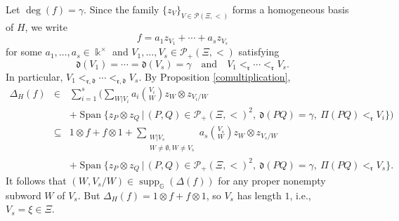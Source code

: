 \documentclass{article}
\makeatletter
\renewenvironment{proof}[1][\proofname]{\par
	\pushQED{\qed}%
	\normalfont \topsep6\p@\@plus6\p@\relax
	\trivlist
	\item[\hskip\labelsep
	\bfseries
	#1\@addpunct{.}]\ignorespaces
}{%
	\popQED\endtrivlist\@endpefalse
}
\theoremstyle{plain}
\theoremstyle{definition}
\numberwithin{equation}{section}
\DeclareMathOperator{\Span}{Span}
\DeclareMathOperator{\supp}{supp}
\newcommand{\GG}{\mathbb{G}}
\newcommand{\dd}{\mathfrak{d}}
\newcommand{\rr}{\mathfrak{r}}
\makeatother
\begin{document}
	\begin{proof}
		Let $\deg(f)=\gamma$. Since the family $\{z_{V}\}_{V\in \mathcal{P}(\Xi, <)}$ forms a homogeneous basis of $H$, we write
		\[
		f = a_{1}z_{V_{1}} + \cdots + a_{s}z_{V_{s}}
		\]
		for some $a_{1},\ldots, a_{s}\in \Bbbk^{\times}$ and $V_{1},\ldots, V_{s}\in \mathcal{P}_{+}(\Xi,<)$ satisfying
		\[
		\dd(V_{1})=\cdots = \dd(V_{s}) =\gamma \quad \text{and} \quad V_{1} <_{\rr} \cdots <_{\rr} V_{s}.
		\]
		In particular, $V_{1} <_{\rr,\dd} \cdots <_{\rr,\dd} V_{s}$. By Proposition \ref{comultiplication},
		\begin{eqnarray*}
			\Delta_{H}(f) & \in & \sum_{i=1}^{s} \Big ( \sum_{W|V_{i}} a_{i} \binom{V_{i}}{W} z_{W}\otimes z_{V_{i}/W} \\
			&& + \Span\bigl\{z_{P}\otimes z_{Q}\,\big|\, (P,Q) \in \mathcal{P}_{+}(\Xi,<)^{2}, ~ \dd(PQ)= \gamma, ~ \Pi(PQ) <_{\rr} V_{i} \bigr\} \Big) \\
			& \subseteq & 1\otimes f+ f\otimes 1 +   \sum_{ \substack{W|V_{s} \\ W\neq \emptyset, W\neq V_{s}}} a_{s} \binom{V_{s}}{W} z_{W}\otimes z_{V_{s}/W} \\
			&& + \Span\bigl\{z_{P}\otimes z_{Q}\,\big|\, (P,Q) \in \mathcal{P}_{+}(\Xi,<)^{2}, ~ \dd(PQ)= \gamma, ~ \Pi(PQ) <_{\rr} V_{s} \bigr\}.
		\end{eqnarray*}
		It follows that $(W,V_{s}/W) \in \supp_{\GG}(\Delta(f))$ for any proper nonempty subword $W$ of $V_{s}$. But $\Delta_{H}(f) =1\otimes f+f\otimes 1$, so $V_{s}$ has length $1$, i.e., $V_{s} =\xi\in \Xi$.
	\end{proof}
	
\end{document}
